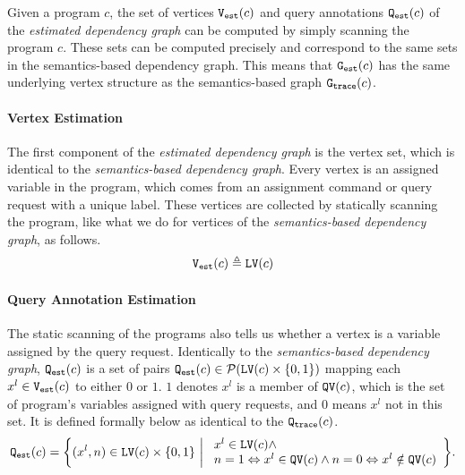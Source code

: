 Given a program $c$, the set of vertices $\mathtt{{V_{est}}}(c)$ and query annotations $\mathtt{{Q_{est}}}(c)$ of the \emph{estimated dependency graph} can be computed by simply
scanning the program $c$. These sets can be computed precisely and correspond to
the same sets in the semantics-based dependency graph.
This means that $\mathtt{{G_{est}}}(c)$ has the same underlying vertex structure as 
the semantics-based graph $\mathtt{{G_{trace}}}(c)$. 
\paragraph{Vertex Estimation}
The first component of the \emph{estimated dependency graph} is the vertex set, which is identical to the 
\emph{semantics-based dependency graph}.
Every vertex is an assigned variable in the program, which comes from an assignment command or query request with a unique label. 
These vertices are collected by statically scanning the program, like what we do for vertices of the \emph{semantics-based dependency graph}, as follows.
%
\[
 \mathtt{{V_{est}}}(c) \triangleq \mathtt{LV}(c)
\]

\paragraph{Query Annotation Estimation}
The static scanning of the programs also tells us whether a vertex is a variable assigned by the query request.
Identically to the 
\emph{semantics-based dependency graph}, $\mathtt{{Q_{est}}}(c)$ is
a set of pairs $\mathtt{{Q_{est}}}(c) \in \mathcal{P}(\mathtt{LV}(c) \times \{0, 1\} )$ 
mapping each $x^l \in \mathtt{{V_{est}}}(c)$ to either $0$ or $1$. 
$1$ denotes $x^{l}$ is a member of $ \mathtt{QV}(c)$, which is the set of program's variables assigned with query requests, 
and $0$ means $x^{l}$ not in this set. 
It is defined formally below as identical to the $\mathtt{{Q_{trace}}}(c)$.
%
\[
 \progF(c) =
 \left\{(x^l, n) 
\in \lvar(c) \times \{0, 1\} 
~ \middle\vert ~
\begin{array}{l}
 x^l \in \lvar(c) \land 
 \\ 
 n = 1 \Leftrightarrow x^l \in \qvar(c) \land n = 0 \Leftrightarrow x^l \notin \qvar(c)
\end{array}
\right\}.
\]
